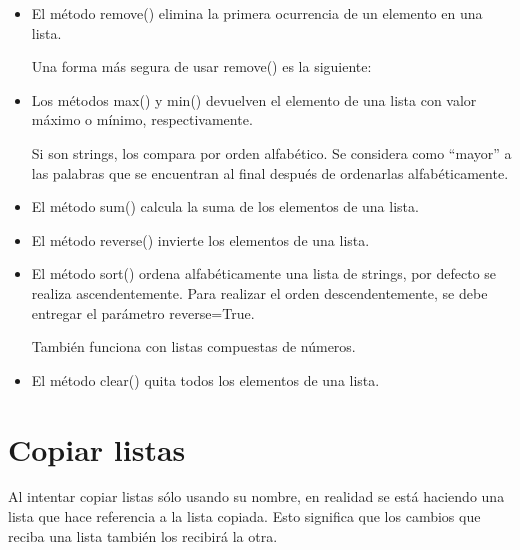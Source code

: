 \documentclass{report}
\newcommand{\doble}[1]{``#1''}
\begin{document}
{\begin{itemize}
  \item El método remove() elimina la primera ocurrencia de un elemento en una lista.
  

  Una forma más segura de usar remove() es la siguiente:


  \item Los métodos max() y min() devuelven el elemento de una lista con valor máximo o mínimo, respectivamente.


  Si son strings, los compara por orden alfabético. Se considera como \doble{mayor} a las palabras que se encuentran al final después de ordenarlas alfabéticamente.


  \item El método sum() calcula la suma de los elementos de una lista.
  

  \item El método reverse() invierte los elementos de una lista.
  

  \item El método sort() ordena alfabéticamente una lista de strings, por defecto se realiza ascendentemente. Para realizar el orden descendentemente, se debe entregar el parámetro reverse=True.
  
  
  También funciona con listas compuestas de números.


  \item El método clear() quita todos los elementos de una lista.


\end{itemize}

\section{Copiar listas}

Al intentar copiar listas sólo usando su nombre, en realidad se está haciendo una lista que hace referencia a la lista copiada. Esto significa que los cambios que reciba una lista también los recibirá la otra.

}
\end{document}
